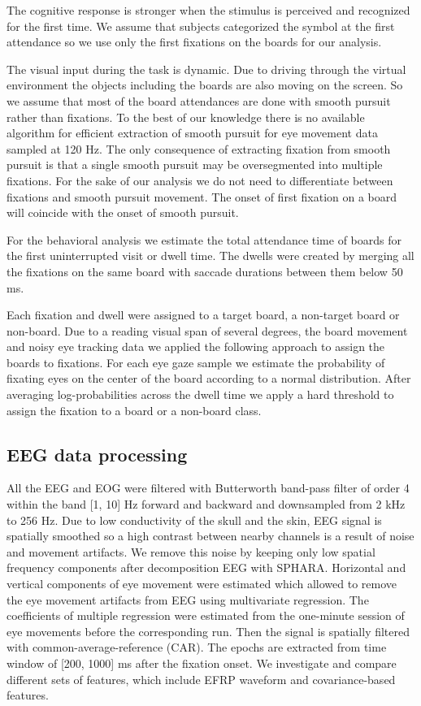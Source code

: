 \documentclass[12pt]{iopart}
\begin{document}
The cognitive response is stronger when the stimulus is perceived and recognized
for the first time. We assume that subjects categorized the symbol at the first
attendance so we use only the first fixations on the boards for our analysis.

The visual input during the task is dynamic. Due to driving through
the virtual environment the objects including the boards are also moving on the screen.
So we assume that most of the board attendances are done with
smooth pursuit rather than fixations. 
To the best of our knowledge there is no available algorithm for efficient
extraction of smooth pursuit for eye movement data sampled at 120 Hz.
The only consequence of 
extracting fixation from smooth pursuit is that a single smooth pursuit
may be oversegmented into multiple fixations.
For the sake of our analysis we do not need to differentiate between
fixations and smooth pursuit movement. The onset of first fixation on a board
will coincide with the onset of smooth pursuit.

For the behavioral analysis we estimate the total attendance time of boards
for the first uninterrupted visit or dwell time. The dwells were created
by merging all the fixations on the same board with saccade durations
between them below 50 ms.

Each fixation and dwell were assigned to a target board, a non-target board or non-board.
Due to a reading visual span of several degrees, the board movement and 
noisy eye tracking data we applied the following approach to assign the boards
to fixations. For each eye gaze sample we estimate the probability of
fixating eyes on the center of the board according to a normal distribution.
After averaging log-probabilities across the dwell time we apply a hard
threshold to assign the fixation to a board or a non-board class.


\subsection{EEG data processing}
All the EEG and EOG were filtered with Butterworth band-pass filter
of order 4 within the band [1, 10] Hz
forward and backward and downsampled from 2 kHz to 256 Hz.
Due to low conductivity of the skull and the skin,
EEG signal is spatially smoothed so a high contrast between nearby channels
is a result of noise and movement artifacts. We remove this noise
by keeping only low spatial frequency components after decomposition EEG with SPHARA.
Horizontal and vertical components of eye movement were estimated which allowed
to remove the eye movement artifacts from EEG using multivariate regression.
The coefficients of multiple regression were estimated from the 
one-minute session of eye movements before the corresponding run.
Then the signal is spatially
filtered with common-average-reference (CAR). The epochs are extracted
from time window of [200, 1000] ms after the fixation onset.
We investigate and compare different sets
of features, which include EFRP waveform and covariance-based features.
\end{document}
